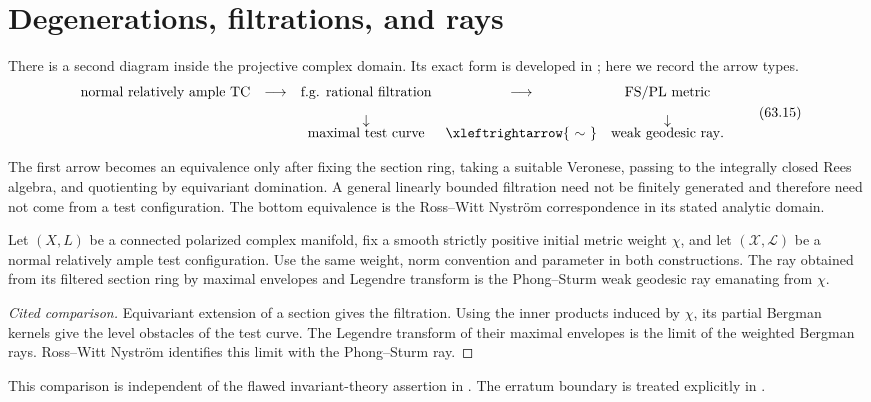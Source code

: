 \section{Degenerations, filtrations, and rays}
\label{sec:dict-degenerations}

There is a second diagram inside the projective complex domain.
Its exact form is developed in ; here we
record the arrow types.
\[
\begin{array}{ccccc}
\text{normal relatively ample TC}
&\longrightarrow&
\text{f.g. rational filtration}
&\longrightarrow&
\text{FS/PL metric}
\\[3mm]
&&\downarrow&&\downarrow
\\[-1mm]
&&\text{maximal test curve}
&\xleftrightarrow{\ \sim\ }&
\text{weak geodesic ray}.
\end{array}
\tag{63.15}\label{eq:dict-degeneration-diagram}
\]

The first arrow becomes an equivalence only after fixing the section ring,
taking a suitable Veronese, passing to the integrally closed Rees algebra,
and quotienting by equivariant domination.
A general linearly bounded filtration need not be finitely generated and
therefore need not come from a test configuration.
The bottom equivalence is the Ross--Witt Nystr\"om correspondence in its
stated analytic domain.

\begin{proposition}\label{prop:dict-degeneration-commutes}
Let $(X,L)$ be a connected polarized complex manifold, fix a smooth strictly
positive initial metric weight $\chi$, and let
$(\mathcal X,\mathcal L)$ be a normal relatively ample test
configuration. Use the same weight, norm convention and parameter in both
constructions. The ray obtained from its filtered section ring by maximal
envelopes and Legendre transform is the Phong--Sturm weak geodesic ray
emanating from $\chi$.
\end{proposition}

\begin{proof}[Cited comparison]
Equivariant extension of a section gives the filtration.
Using the inner products induced by $\chi$, its partial Bergman kernels give the level obstacles of the test curve.
The Legendre transform of their maximal envelopes is the limit of the
weighted Bergman rays.
Ross--Witt Nystr\"om
\cite[Theorem~9.2 and Section~9]{RWN14} identifies this limit with the Phong--Sturm ray.
\end{proof}

This comparison is independent of the flawed invariant-theory assertion in
\cite[Theorem~5.6]{BHJ19}.
The erratum boundary is treated explicitly in
.

